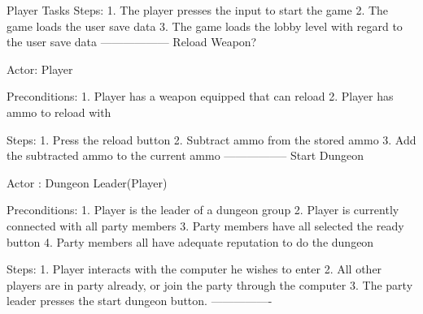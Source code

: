 \documentclass[12pt]{report}
\begin{document}
\begin{section}{Player Tasks}
Steps:
1. The player presses the input to start the game
2. The game loads the user save data
3. The game loads the lobby level with regard to the user save data
------------------
Reload Weapon? %

Actor: Player

Preconditions: 
1. Player has a weapon equipped that can reload
2. Player has ammo to reload with

Steps:
1. Press the reload button
2. Subtract ammo from the stored ammo
3. Add the subtracted ammo to the current ammo
-----------------
Start Dungeon %

Actor : Dungeon Leader(Player)

Preconditions:
1. Player is the leader of a dungeon group
2. Player is currently connected with all party members
3. Party members have all selected the ready button
4. Party members all have adequate reputation to do the dungeon

Steps:
1. Player interacts with the computer he wishes to enter
2. All other players are in party already, or join the party through the computer
3. The party leader presses the start dungeon button.
----------------

\end{section}
\end{document}
